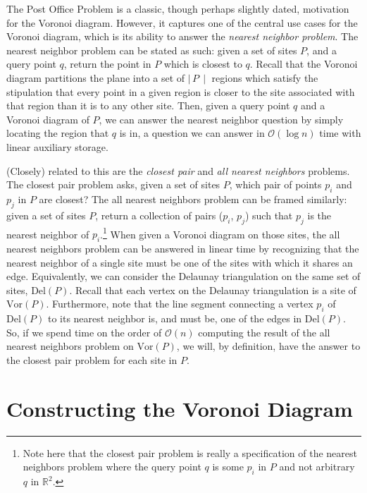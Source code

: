 \documentclass[12pt,twoside]{reedthesis}
\begin{document}
    The Post Office Problem is a classic, though perhaps slightly dated, motivation for the Voronoi diagram. However, it captures one of the central use cases for the Voronoi diagram, which is its ability to answer the \emph{nearest neighbor problem}. The nearest neighbor problem can be stated as such: given a set of sites $P$, and a query point $q$, return the point in $P$ which is closest to $q$. Recall that the Voronoi diagram partitions the plane into a set of $\mid\,P\,\mid$ regions which satisfy the stipulation that every point in a given region is closer to the site associated with that region than it is to any other site. Then, given a query point $q$ and a Voronoi diagram of $P$, we can answer the nearest neighbor question by simply locating the region that $q$ is in, a question we can answer in $\mathcal{O}(\log n)$ time with linear auxiliary storage.\citep[p. 214]{shamos}\par
    
    (Closely) related to this are the \emph{closest pair} and \emph{all nearest neighbors} problems. The closest pair problem asks, given a set of sites $P$, which pair of points $p_{i}$ and $p_{j}$ in $P$ are closest? The all nearest neighbors problem can be framed similarly: given a set of sites $P$, return a collection of pairs ($p_{i}$, $p_{j}$) such that $p_{j}$ is the nearest neighbor of $p_{i}$.\footnote{Note here that the closest pair problem is really a specification of the nearest neighbors problem where the query point $q$ is some $p_{i}$ in $P$ and not arbitrary $q$ in $\mathds{R}^2$.} When given a Voronoi diagram on those sites, the all nearest neighbors problem can be answered in linear time by recognizing that the nearest neighbor of a single site must be one of the sites with which it shares an edge. Equivalently, we can consider the Delaunay triangulation on the same set of sites, $\mbox{Del}(P)$. Recall that each vertex on the Delaunay triangulation is a site of $\mbox{Vor}(P)$. Furthermore, note that the line segment connecting a vertex $p_{i}$ of $\mbox{Del}(P)$ to its nearest neighbor is, and must be, one of the edges in $\mbox{Del}(P)$. So, if we spend time on the order of $\mathcal{O}(n)$ computing the result of the all nearest neighbors problem on $\mbox{Vor}(P)$, we will, by definition, have the answer to the closest pair problem for each site in $P$. 

  \chapter*{Constructing the Voronoi Diagram}
    \setcounter{chapter}{2}
    \setcounter{section}{0}
\end{document}
